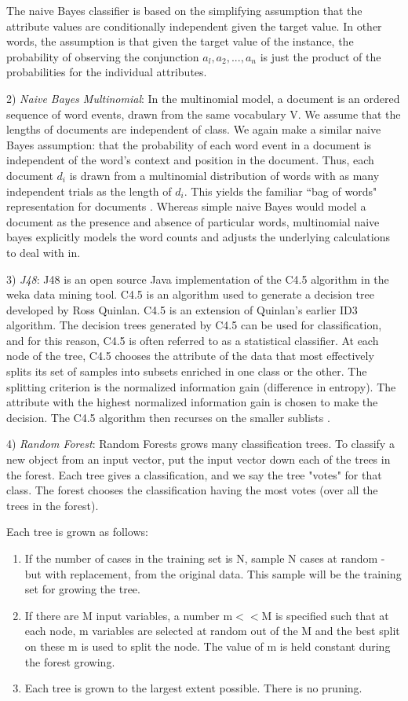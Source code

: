 \documentclass[conference]{IEEEtran}
\begin{document}
The naive Bayes classifier is based on the simplifying assumption that the attribute values are conditionally independent given the target value. In other words, the assumption is that given the target value of the instance, the probability of observing the conjunction $a_l, a_2,..., a_n$ is just the product of the probabilities for the individual attributes.

2) \textit{Naive Bayes Multinomial}: In the multinomial model, a document is an ordered sequence of word events, drawn from the same vocabulary V. We assume that the lengths of documents are independent of class. We again make a similar naive Bayes assumption: that the probability of each word event in a document is independent of the word’s context and position in the document. Thus, each document $d_i$ is drawn from a multinomial distribution of words with as many independent trials as the length of $d_i$. This yields the familiar ``bag of words" representation for documents \cite{Nigam}. Whereas simple naive Bayes would model a document as the presence and absence of particular words, multinomial naive bayes explicitly models the word counts and adjusts the underlying calculations to deal with in. 

3) \textit{J48}: J48 is an open source Java implementation of the C4.5 algorithm in the weka data mining tool. C4.5 is an algorithm used to generate a decision tree developed by Ross Quinlan. C4.5 is an extension of Quinlan's earlier ID3 algorithm. The decision trees generated by C4.5 can be used for classification, and for this reason, C4.5 is often referred to as a statistical classifier. At each node of the tree, C4.5 chooses the attribute of the data that most effectively splits its set of samples into subsets enriched in one class or the other. The splitting criterion is the normalized information gain (difference in entropy). The attribute with the highest normalized information gain is chosen to make the decision. The C4.5 algorithm then recurses on the smaller sublists \cite{j48}.

4) \textit{Random Forest}: Random Forests grows many classification trees. To classify a new object from an input vector, put the input vector down each of the trees in the forest. Each tree gives a classification, and we say the tree "votes" for that class. The forest chooses the classification having the most votes (over all the trees in the forest).

Each tree is grown as follows:

\begin{enumerate}
\item If the number of cases in the training set is N, sample N cases at random - but with replacement, from the original data. This sample will be the training set for growing the tree.
\item If there are M input variables, a number m$<<$M is specified such that at each node, m variables are selected at random out of the M and the best split on these m is used to split the node. The value of m is held constant during the forest growing.
\item Each tree is grown to the largest extent possible. There is no pruning.
\end{enumerate}
\end{document}

